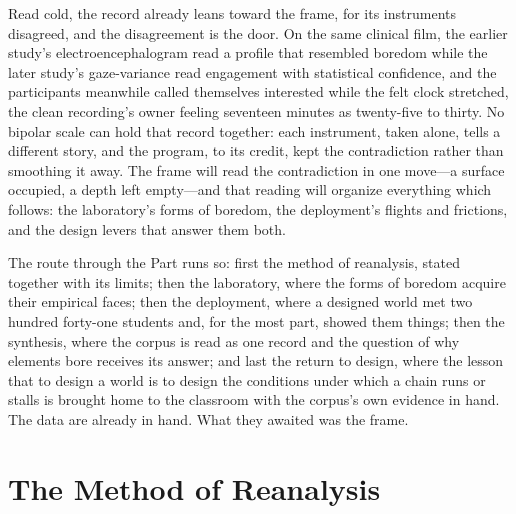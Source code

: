 \documentclass{article}
\begin{document}
Read cold, the record already leans toward the frame, for its instruments disagreed, and the disagreement is the door. On the same clinical film, the earlier study's electroencephalogram read a profile that resembled boredom while the later study's gaze-variance read engagement with statistical confidence, and the participants meanwhile called themselves interested while the felt clock stretched, the clean recording's owner feeling seventeen minutes as twenty-five to thirty. No bipolar scale can hold that record together: each instrument, taken alone, tells a different story, and the program, to its credit, kept the contradiction rather than smoothing it away. The frame will read the contradiction in one move---a surface occupied, a depth left empty---and that reading will organize everything which follows: the laboratory's forms of boredom, the deployment's flights and frictions, and the design levers that answer them both.

The route through the Part runs so: first the method of reanalysis, stated together with its limits; then the laboratory, where the forms of boredom acquire their empirical faces; then the deployment, where a designed world met two hundred forty-one students and, for the most part, showed them things; then the synthesis, where the corpus is read as one record and the question of why elements bore receives its answer; and last the return to design, where the lesson that to design a world is to design the conditions under which a chain runs or stalls is brought home to the classroom with the corpus's own evidence in hand. The data are already in hand. What they awaited was the frame.

\section{The Method of Reanalysis}
\end{document}

